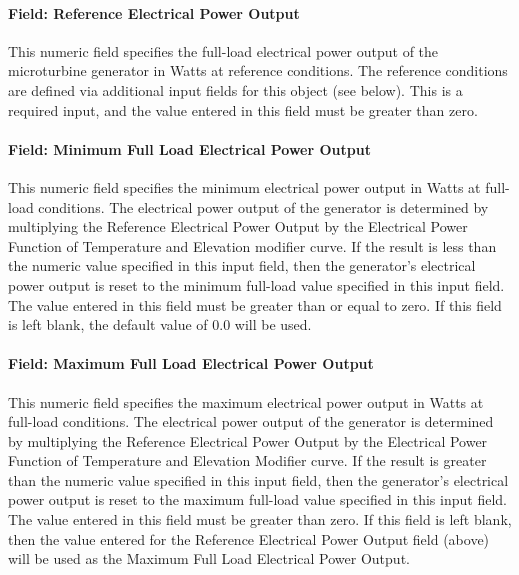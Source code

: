 \paragraph{Field: Reference Electrical Power Output}\label{field-reference-electrical-power-output}

This numeric field specifies the full-load electrical power output of the microturbine generator in Watts at reference conditions. The reference conditions are defined via additional input fields for this object (see below). This is a required input, and the value entered in this field must be greater than zero.

\paragraph{Field: Minimum Full Load Electrical Power Output}\label{field-minimum-full-load-electrical-power-output}

This numeric field specifies the minimum electrical power output in Watts at full-load conditions. The electrical power output of the generator is determined by multiplying the Reference Electrical Power Output by the Electrical Power Function of Temperature and Elevation modifier curve. If the result is less than the numeric value specified in this input field, then the generator's electrical power output is reset to the minimum full-load value specified in this input field. The value entered in this field must be greater than or equal to zero. If this field is left blank, the default value of 0.0 will be used.

\paragraph{Field: Maximum Full Load Electrical Power Output}\label{field-maximum-full-load-electrical-power-output}

This numeric field specifies the maximum electrical power output in Watts at full-load conditions. The electrical power output of the generator is determined by multiplying the Reference Electrical Power Output by the Electrical Power Function of Temperature and Elevation Modifier curve. If the result is greater than the numeric value specified in this input field, then the generator's electrical power output is reset to the maximum full-load value specified in this input field. The value entered in this field must be greater than zero. If this field is left blank, then the value entered for the Reference Electrical Power Output field (above) will be used as the Maximum Full Load Electrical Power Output.

